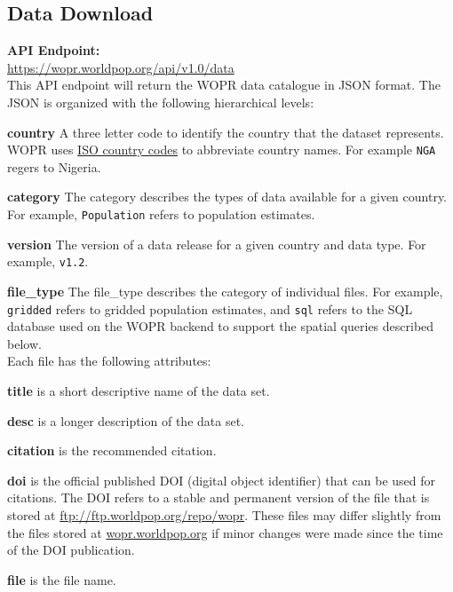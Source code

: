 \documentclass[]{article}
\begin{document}
\subsection{Data Download}\label{data-download}

\textbf{API Endpoint:}\\
\url{https://wopr.worldpop.org/api/v1.0/data}\\

This API endpoint will return the WOPR data catalogue in JSON format.
The JSON is organized with the following hierarchical levels:

\textbf{country} A three letter code to identify the country that the
dataset represents. WOPR uses
\href{https://en.wikipedia.org/wiki/ISO_3166-1_alpha-3}{ISO country
codes} to abbreviate country names. For example
\texttt{\textquotesingle{}NGA\textquotesingle{}} regers to Nigeria.

\textbf{category} The category describes the types of data available for
a given country. For example,
\texttt{\textquotesingle{}Population\textquotesingle{}} refers to
population estimates.

\textbf{version} The version of a data release for a given country and
data type. For example,
\texttt{\textquotesingle{}v1.2\textquotesingle{}}.

\textbf{file\_type} The file\_type describes the category of individual
files. For example, \texttt{\textquotesingle{}gridded\textquotesingle{}}
refers to gridded population estimates, and
\texttt{\textquotesingle{}sql\textquotesingle{}} refers to the SQL
database used on the WOPR backend to support the spatial queries
described below.\\

Each file has the following attributes:

\textbf{title} is a short descriptive name of the data set.

\textbf{desc} is a longer description of the data set.

\textbf{citation} is the recommended citation.

\textbf{doi} is the official published DOI (digital object identifier)
that can be used for citations. The DOI refers to a stable and permanent
version of the file that is stored at
\url{ftp://ftp.worldpop.org/repo/wopr}. These files may differ slightly
from the files stored at
\href{https://wopr.worldpop.org}{wopr.worldpop.org} if minor changes
were made since the time of the DOI publication.

\textbf{file} is the file name.
\end{document}
